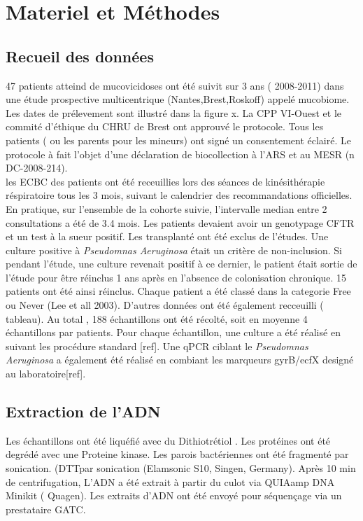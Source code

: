 \documentclass[12pt,a4paper]{article}
\begin{document}
\section{Materiel et Méthodes}
\subsection{Recueil des données}

47 patients atteind de mucovicidoses ont été suivit sur 3 ans ( 2008-2011) dans une étude prospective multicentrique (Nantes,Brest,Roskoff) appelé mucobiome.
Les dates de prélevement sont illustré dans la figure x.
La CPP VI-Ouest et le commité d’éthique du CHRU de Brest ont approuvé le protocole. Tous les patients ( ou les parents pour les mineurs) ont signé un consentement éclairé. Le protocole à fait l’objet d’une déclaration de biocollection à l’ARS et au MESR (n DC-2008-214).\\
les ECBC des patients ont été receuillies lors des séances de kinésithérapie réspiratoire tous les 3 mois, suivant le calendrier des recommandations officielles. En pratique, sur l’ensemble de la cohorte suivie, l’intervalle median entre 2 consultations a été de 3.4 mois.
Les patients devaient avoir un genotypage CFTR et un test à la sueur positif. Les transplanté ont été exclus de l’études.
Une culture positive à \textit{Pseudomnas Aeruginosa} était un critère de non-inclusion. Si pendant l’étude, une culture revenait positif à ce dernier, le patient était sortie de l’étude pour être réinclus 1 ans après en l’absence de colonisation chronique. 15 patients ont été ainsi réinclus.
Chaque patient a été classé dans la categorie Free ou Never (Lee et all 2003). D’autres données ont été également recceuilli ( tableau).
Au total , 188 échantillons ont été récolté, soit en moyenne 4 échantillons par patients.
Pour chaque échantillon, une culture a été réalisé en suivant les procédure standard [ref]. Une qPCR ciblant le \textit{Pseudomnas Aeruginosa} a également été réalisé en combiant les marqueurs gyrB/ecfX designé au laboratoire[ref].

\subsection{Extraction de l’ADN}

Les échantillons ont été liquéfié avec du Dithiotrétiol . Les protéines ont été degrédé avec une Proteine kinase.
Les parois bactériennes ont été fragmenté par sonication. (DTTpar sonication (Elamsonic S10, Singen, Germany). Après 10 min de centrifugation, L’ADN a été extrait à partir du culot via QUIAamp DNA Minikit ( Quagen).
Les extraits d’ADN ont été envoyé pour séquençage via un prestataire GATC.
\end{document}

